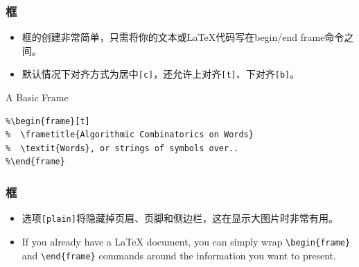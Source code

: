 \documentclass[aspectratio=1610,utf8]{beamer}
\begin{document}
\begin{frame}[fragile]
  \frametitle{框}

  \begin{itemize}
    \setlength{\itemsep}{8pt}
    \item 
      框的创建非常简单，只需将你的文本或\LaTeX{}代码写在begin/end frame命令之间。
    \item 
      默认情况下对齐方式为居中\texttt{[c]}，还允许上对齐\texttt{[t]}、下对齐\texttt{[b]}。
  \end{itemize}

  \begin{block}{A Basic Frame}
\begin{verbatim}
%\begin{frame}[t]
%  \frametitle{Algorithmic Combinatorics on Words}
%  \textit{Words}, or strings of symbols over..
%\end{frame}
\end{verbatim}
  \end{block}

\end{frame}


\begin{frame}[fragile]
  \frametitle{框}

  \begin{itemize}
    \setlength{\itemsep}{8pt}
    \item 
      选项\texttt{[plain]}将隐藏掉页眉、页脚和侧边栏，这在显示大图片时非常有用。
    \item 
      If you already have a \LaTeX{} document, you can simply wrap \verb|\begin{frame}| and \verb|\end{frame}| commands around the information you want to present.
  \end{itemize}
\end{frame}
\end{document}
